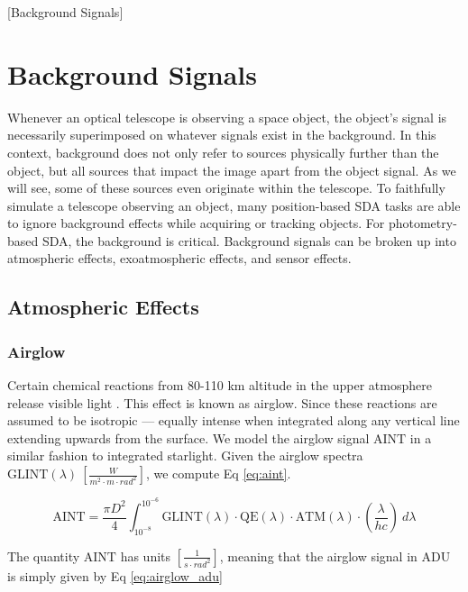 [Background Signals]
\chapter{Background Signals}
\graphicspath{{/Users/liamrobinson/Documents/PyLightCurves/docs/build/html/_images}}

Whenever an optical telescope is observing a space object, the object's signal is necessarily superimposed on whatever signals exist in the background. In this context, background does not only refer to sources physically further than the object, but all sources that impact the image apart from the object signal. As we will see, some of these sources even originate within the telescope. To faithfully simulate a telescope observing an object, many position-based SDA tasks are able to ignore background effects while acquiring or tracking objects. For photometry-based SDA, the background is critical. Background signals can be broken up into atmospheric effects, exoatmospheric effects, and sensor effects. 

\section{Atmospheric Effects}

\subsection{Airglow}

Certain chemical reactions from 80-110 km altitude in the upper atmosphere release visible light
\cite{krag2003}. This effect is known as
airglow. Since these reactions are assumed to be isotropic ---  equally intense when integrated along any
vertical line extending upwards from the surface. We model the airglow signal $\textrm{AINT}$ in a
similar fashion to integrated starlight. Given the airglow spectra $\textrm{GLINT}(\lambda) \:
\left[ \frac{W}{m^2\cdot m \cdot rad^2} \right]$, we compute Eq \ref{eq:aint}.

\begin{equation} \label{eq:aint}
 \textrm{AINT} = \frac{\pi D^2}{4}
  \int_{10^{-8}}^{10^{-6}}{ \textrm{GLINT}(\lambda) \cdot \textrm{QE}(\lambda) \cdot \textrm{ATM}(\lambda)
  \cdot \left( \frac{\lambda}{h c} \right) \: d\lambda}  
\end{equation}

The quantity $\textrm{AINT}$ has units $\left[ \frac{1}{s\cdot rad^2} \right]$, meaning that the
airglow signal in ADU is simply given by Eq \ref{eq:airglow_adu}

